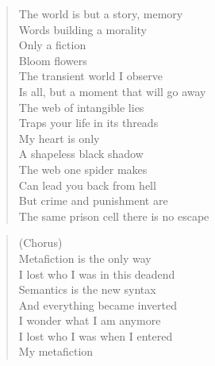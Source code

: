 \phantom{;}
\clearpage



\begin{minipage}{0.5\textwidth}
    \begin{verse}
    The world is but a story, memory \\
	Words building a morality \\
	Only a fiction \\
	Bloom flowers \\
	The transient world I observe \\
	Is all, but a moment that will go away \\
	The web of intangible lies \\
	Traps your life in its threads \\
	My heart is only \\
	A shapeless black shadow \\
	The web one spider makes \\
	Can lead you back from hell \\
	But crime and punishment are \\
	The same prison cell there is no escape
    \end{verse}

    \begin{verse}
    (Chorus) \\
	Metafiction is the only way \\
	I lost who I was in this deadend \\
	Semantics is the new syntax \\
	And everything became inverted \\
	I wonder what I am anymore \\
	I lost who I was when I entered \\
	My metafiction
    \end{verse}

\end{minipage}
